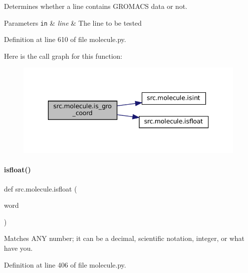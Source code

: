 Determines whether a line contains G\+R\+O\+M\+A\+CS data or not. 


\begin{DoxyParams}[1]{Parameters}
\mbox{\tt in}  & {\em line} & The line to be tested \\
\hline
\end{DoxyParams}


Definition at line 610 of file molecule.\+py.

Here is the call graph for this function\+:
\nopagebreak
\begin{figure}[H]
\begin{center}
\leavevmode
\includegraphics[width=339pt]{namespacesrc_1_1molecule_a2cf7fe49895eedd6c60b7394f1435529_cgraph}
\end{center}
\end{figure}
\mbox{\label{namespacesrc_1_1molecule_ac2056d27322c6ee6dff0bef3755f2ed3}} 
\paragraph{\texorpdfstring{isfloat()}{isfloat()}}
{\footnotesize\ttfamily def src.\+molecule.\+isfloat (\begin{DoxyParamCaption}\item[{}]{word }\end{DoxyParamCaption})}



Matches A\+NY number; it can be a decimal, scientific notation, integer, or what have you. 



Definition at line 406 of file molecule.\+py.

\mbox{\label{namespacesrc_1_1molecule_a651f6c6d23932f5a2151784c992e94a8}} 
